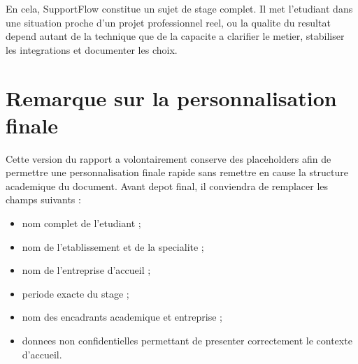 En cela, SupportFlow constitue un sujet de stage complet. Il met l'etudiant dans une situation proche d'un projet professionnel reel, ou la qualite du resultat depend autant de la technique que de la capacite a clarifier le metier, stabiliser les integrations et documenter les choix.

\section{Remarque sur la personnalisation finale}

Cette version du rapport a volontairement conserve des placeholders afin de permettre une personnalisation finale rapide sans remettre en cause la structure academique du document. Avant depot final, il conviendra de remplacer les champs suivants :

\begin{itemize}[leftmargin=1.2cm]
  \item nom complet de l'etudiant ;
  \item nom de l'etablissement et de la specialite ;
  \item nom de l'entreprise d'accueil ;
  \item periode exacte du stage ;
  \item nom des encadrants academique et entreprise ;
  \item donnees non confidentielles permettant de presenter correctement le contexte d'accueil.
\end{itemize}
